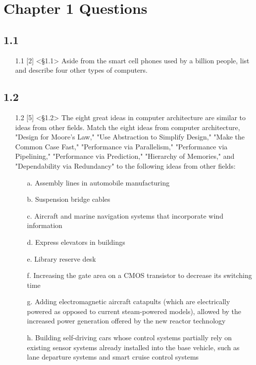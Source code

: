 \documentclass{article}
\begin{document}
\section*{Chapter 1 Questions}

\subsection*{1.1}
\begin{enumerate}
    \item[1.1] [2] <§1.1> Aside from the smart cell phones used by a billion people, list and describe four other types of computers.
\end{enumerate}

\subsection*{1.2}
\begin{enumerate}
    \item[1.2] [5] <§1.2> The eight great ideas in computer architecture are similar to ideas from other fields. Match the eight ideas from computer architecture, "Design for Moore's Law," "Use Abstraction to Simplify Design," "Make the Common Case Fast," "Performance via Parallelism," "Performance via Pipelining," "Performance via Prediction," "Hierarchy of Memories," and "Dependability via Redundancy" to the following ideas from other fields:
    \begin{enumerate}
        \item[a.] Assembly lines in automobile manufacturing
        \item[b.] Suspension bridge cables
        \item[c.] Aircraft and marine navigation systems that incorporate wind information
        \item[d.] Express elevators in buildings
        \item[e.] Library reserve desk
        \item[f.] Increasing the gate area on a CMOS transistor to decrease its switching time
        \item[g.] Adding electromagnetic aircraft catapults (which are electrically powered as opposed to current steam-powered models), allowed by the increased power generation offered by the new reactor technology
        \item[h.] Building self-driving cars whose control systems partially rely on existing sensor systems already installed into the base vehicle, such as lane departure systems and smart cruise control systems
    \end{enumerate}
\end{enumerate}
\end{document}
